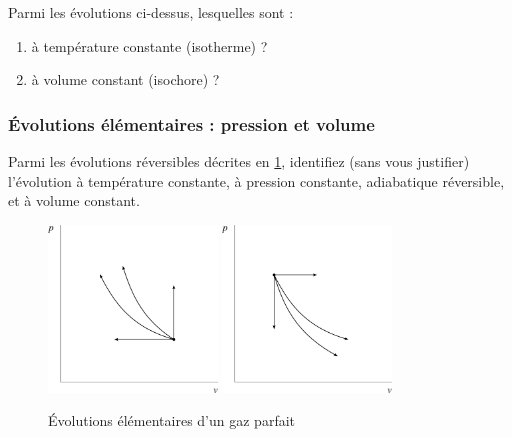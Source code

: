 	Parmi les évolutions ci-dessus, lesquelles sont : 
	\begin{enumerate}
		\item à température constante (isotherme) ?
		\item à volume constant (isochore) ?
	\end{enumerate}


\subsubsection{Évolutions élémentaires : pression et volume}
\label{exo_retrouver_pv}

	Parmi les évolutions réversibles décrites en \cref{fig_pvel}, identifiez (sans vous justifier) l’évolution à température constante, à pression constante, adiabatique réversible, et à volume constant.
	
	\begin{figure}[!bh]
		\begin{center}
			\includegraphics[width=0.4\textwidth, max width=0.6\columnwidth]{images/exo_pv_elementaires1.png}
			\includegraphics[width=0.4\textwidth, max width=0.6\columnwidth]{images/exo_pv_elementaires2.png}
		\end{center}
		\caption{Évolutions élémentaires d’un gaz parfait}
		\label{fig_pvel}
	\end{figure}
	

